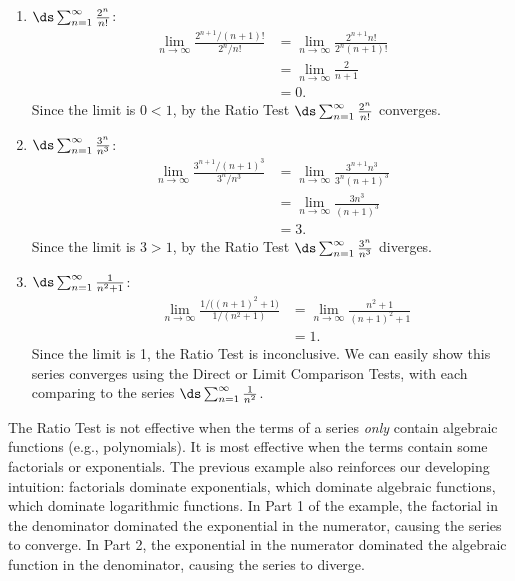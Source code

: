 
{\begin{enumerate}
	\item $\ds \sum_{n=1}^\infty \frac{2^n}{n!}$:\\[-3\baselineskip]
	\begin{align*}
		\lim_{n\to\infty}\frac{2^{n+1}/(n+1)!}{2^n/n!}
		&= \lim_{n\to\infty} \frac{2^{n+1}n!}{2^n(n+1)!}\\
		&= \lim_{n\to\infty} \frac{2}{n+1}\\
		&=0.
	\end{align*}
	Since the limit is $0<1$, by the Ratio Test $\ds\sum_{n=1}^\infty \frac{2^n}{n!}$ converges.
	
	\item	$\ds\sum_{n=1}^\infty \frac{3^n}{n^3}$:\\[-3\baselineskip]
	\begin{align*}
		\lim_{n\to\infty} \frac{3^{n+1}/(n+1)^3}{3^n/n^3}
		&= \lim_{n\to\infty}\frac{3^{n+1}n^3}{3^n(n+1)^3}\\
		&= \lim_{n\to\infty} \frac{3n^3}{(n+1)^3}\\
		&= 3.
	\end{align*}
	Since the limit is $3>1$, by the Ratio Test $\ds\sum_{n=1}^\infty \frac{3^n}{n^3}$ diverges.
	
	\item  $\ds\sum_{n=1}^\infty \frac{1}{n^2+1}$:\\[-3\baselineskip]
	\begin{align*}
		\qquad\lim_{n\to\infty} \frac{1/\big((n+1)^2+1\big)}{1/(n^2+1)}
		&= \lim_{n\to\infty} \frac{n^2+1}{(n+1)^2+1}\\
		&= 1.
	\end{align*}
	Since the limit is 1, the Ratio Test is inconclusive. We can easily show this series converges using the Direct or Limit Comparison Tests, with each comparing to the series $\ds \sum_{n=1}^\infty \frac{1}{n^2}$.\eoehere
\end{enumerate}}

The Ratio Test is not effective when the terms of a series \textit{only} contain algebraic functions (e.g., polynomials). It is most effective when the terms contain some factorials or exponentials. The previous example also reinforces our developing intuition: factorials dominate exponentials, which dominate algebraic functions, which dominate logarithmic functions. In Part 1 of the example, the factorial in the denominator dominated the exponential in the numerator, causing the series to converge. In Part 2, the exponential in the numerator dominated the algebraic function in the denominator, causing the series to diverge.

